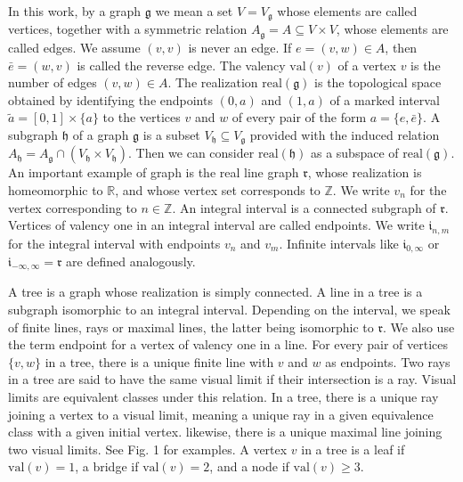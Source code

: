 \documentclass{amsart}
\theoremstyle{definition}
\begin{document}
In this work, by a graph $\mathfrak{g}$ we mean a
set $V=V_{\mathfrak{g}}$ whose elements are called vertices,
together with a symmetric relation 
$A_{\mathfrak{g}}=A\subseteq V\times V$,
whose elements are called edges. We assume $(v,v)$ is never 
an edge. If $e=(v,w)\in A$, then $\bar{e}=(w,v)$ is called
the reverse edge. The valency $\mathrm{val}(v)$ of 
a vertex $v$ is the number of edges $(v,w)\in A$. 
The realization $\mathrm{real}(\mathfrak{g})$ is 
the topological space obtained by identifying  the endpoints $(0,a)$ and $(1,a)$ of a marked interval
$\tilde{a}=[0,1]\times\{a\}$ to the vertices $v$ and $w$
of every pair of the form $a=\{e,\bar{e}\}$.
A subgraph $\mathfrak{h}$ of a graph $\mathfrak{g}$ is a 
subset  $V_{\mathfrak{h}}\subseteq V_{\mathfrak{g}}$ provided
with the induced relation $A_{\mathfrak{h}}=
A_{\mathfrak{g}}\cap(V_{\mathfrak{h}}\times V_{\mathfrak{h}})$.
Then we can consider $\mathrm{real}(\mathfrak{h})$ as a 
subspace of $\mathrm{real}(\mathfrak{g})$. 
An important example of graph is the real line 
graph $\mathfrak{r}$, whose realization is homeomorphic to 
$\mathbb{R}$, and whose vertex set corresponds to
$\mathbb{Z}$. We write $v_n$ for the vertex corresponding 
to $n\in\mathbb{Z}$. An integral interval is a 
connected subgraph of $\mathfrak{r}$. 
Vertices of valency one in an integral interval are 
called  endpoints.
We write $\mathfrak{i}_{n,m}$ for the integral interval with
endpoints $v_n$ and $v_m$. Infinite intervals like
$\mathfrak{i}_{0,\infty}$ or $\mathfrak{i}_{-\infty,\infty}
=\mathfrak{r}$ are defined analogously. 

A tree is a graph whose realization
is simply connected. A line in a tree is a subgraph isomorphic 
to an integral interval. Depending on the interval, we speak 
of finite lines, rays or maximal lines, the latter being
isomorphic to $\mathfrak{r}$. We also use the term endpoint
for a vertex of valency one in a line.
For every pair of vertices $\{v,w\}$ in a tree,
there is a unique finite line with $v$ and $w$ as
endpoints. Two rays in a tree are said to have the 
same visual limit
if their intersection is a ray. Visual limits are
equivalent classes under this relation. In a tree,
there is a unique ray joining a vertex to a visual limit,
meaning a unique ray in a given equivalence class
with a given initial vertex. likewise,
there is a unique maximal line joining two visual limits. See Fig. 1 for examples.
A vertex $v$ in a tree is a leaf if $\mathrm{val}(v)=1$,
a bridge if $\mathrm{val}(v)=2$, and a node if
$\mathrm{val}(v)\geq3$.
\end{document}
